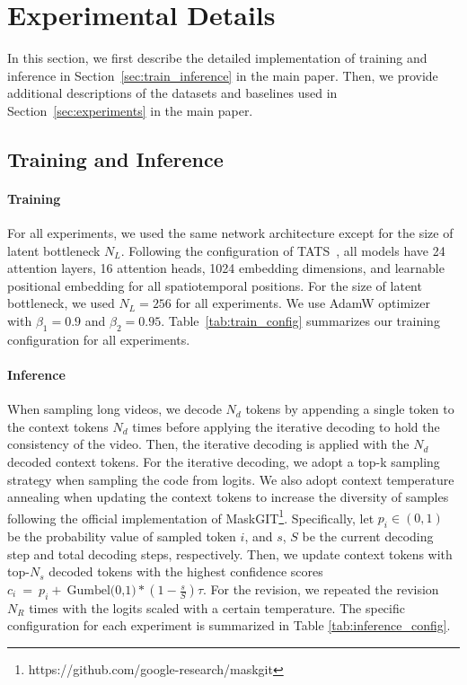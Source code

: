 \documentclass[10pt,twocolumn,letterpaper]{article}
\begin{document}
\section{Experimental Details}
\label{appx:experiment}
In this section, we first describe the detailed implementation of training and inference in Section~\ref{sec:train_inference} in the main paper.
Then, we provide additional descriptions of the datasets and baselines used in Section~\ref{sec:experiments} in the main paper.

\subsection{Training and Inference}
\label{appx:training_inference}
\paragraph{Training}
\label{appx:training}
For all experiments, we used the same network architecture except for the size of latent bottleneck $N_L$. Following the configuration of TATS~\cite{TATS}, all models have 24 attention layers, 16 attention heads, 1024 embedding dimensions, and learnable positional embedding for all spatiotemporal positions. For the size of latent bottleneck, we used $N_L=256$ for all experiments.
We use AdamW optimizer~\cite{AdamW} with $\beta_1 = 0.9$ and $\beta_2 = 0.95$. Table~\ref{tab:train_config} summarizes our training configuration for all experiments.

\paragraph{Inference}
\label{appx:inference}
When sampling long videos, we decode $N_d$ tokens by appending a single token to the context tokens $N_d$ times before applying the iterative decoding to hold the consistency of the video. Then, the iterative decoding is applied with the $N_d$ decoded context tokens. For the iterative decoding, we adopt a top-k sampling strategy when sampling the code from logits. We also adopt context temperature annealing when updating the context tokens to increase the diversity of samples following the official implementation of MaskGIT\footnote{https://github.com/google-research/maskgit}. Specifically, let $p_i \in (0, 1)$ be the probability value of sampled token $i$, and $s$, $S$ be the current decoding step and total decoding steps, respectively. Then, we update context tokens with top-$N_s$ decoded tokens with the highest confidence scores $c_i~=~p_i +~\text{Gumbel(0,1)} * (1-\frac{s}{S})\tau$. For the revision, we repeated the revision $N_R$ times with the logits scaled with a certain temperature. The specific configuration for each experiment is summarized in Table \ref{tab:inference_config}. 
\end{document}
